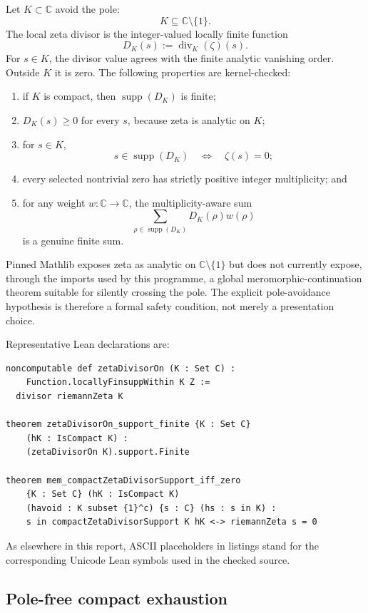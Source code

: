 \documentclass[11pt,a4paper]{article}
\begin{document}
Let $K\subset\mathbb C$ avoid the pole:
\[
  K\subseteq\mathbb C\setminus\{1\}.
\]
The local zeta divisor is the integer-valued locally finite function
\[
  D_K(s):=\operatorname{div}_{K}(\zeta)(s).
\]
For $s\in K$, the divisor value agrees with the finite analytic vanishing
order. Outside $K$ it is zero. The following properties are kernel-checked:
\begin{enumerate}
  \item if $K$ is compact, then
    $\operatorname{supp}(D_K)$ is finite;
  \item $D_K(s)\geq 0$ for every $s$, because zeta is analytic on $K$;
  \item for $s\in K$,
    \[
      s\in\operatorname{supp}(D_K)
      \quad\Longleftrightarrow\quad
      \zeta(s)=0;
    \]
  \item every selected nontrivial zero has strictly positive integer
    multiplicity; and
  \item for any weight $w:\mathbb C\to\mathbb C$, the multiplicity-aware sum
    \[
      \sum_{\rho\in\operatorname{supp}(D_K)}D_K(\rho)w(\rho)
    \]
    is a genuine finite sum.
\end{enumerate}

Pinned Mathlib exposes zeta as analytic on
$\mathbb C\setminus\{1\}$ but does not currently expose, through the imports
used by this programme, a global meromorphic-continuation theorem suitable for
silently crossing the pole. The explicit pole-avoidance hypothesis is therefore
a formal safety condition, not merely a presentation choice.

Representative Lean declarations are:
\begin{lstlisting}
noncomputable def zetaDivisorOn (K : Set C) :
    Function.locallyFinsuppWithin K Z :=
  divisor riemannZeta K

theorem zetaDivisorOn_support_finite {K : Set C}
    (hK : IsCompact K) :
    (zetaDivisorOn K).support.Finite

theorem mem_compactZetaDivisorSupport_iff_zero
    {K : Set C} (hK : IsCompact K)
    (havoid : K subset {1}^c) {s : C} (hs : s in K) :
    s in compactZetaDivisorSupport K hK <-> riemannZeta s = 0
\end{lstlisting}
As elsewhere in this report, ASCII placeholders in listings stand for the
corresponding Unicode Lean symbols used in the checked source.

\subsection{Pole-free compact exhaustion}
\end{document}
